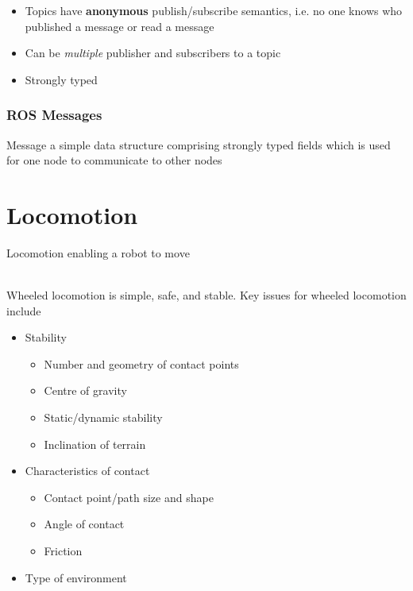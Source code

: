 \documentclass[13pt]{article}
\begin{document}
\begin{itemize}
	\item Topics have \textbf{anonymous} publish/subscribe semantics, i.e. no one knows who published a message or read
	a message
	\item Can be \textit{multiple} publisher and subscribers to a topic
	\item Strongly typed
\end{itemize}

\subsubsection{ROS Messages}%
\begin{defn}{Message}
	a simple data structure comprising strongly typed fields which is used for one node to communicate to other nodes
\end{defn}

\section{Locomotion}%
\begin{defn}{Locomotion}
	enabling a robot to move
\end{defn}

\hfill\\

\noindent
Wheeled locomotion is simple, safe, and stable. Key issues for wheeled locomotion include
\begin{itemize}
	\item Stability
	\begin{itemize}
		\item Number and geometry of contact points
		\item Centre of gravity
		\item Static/dynamic stability
		\item Inclination of terrain
	\end{itemize}
	\item Characteristics of contact
	\begin{itemize}
		\item Contact point/path size and shape
		\item Angle of contact
		\item Friction
	\end{itemize}
	\item Type of environment
\end{itemize}

\hfill
\end{document}
